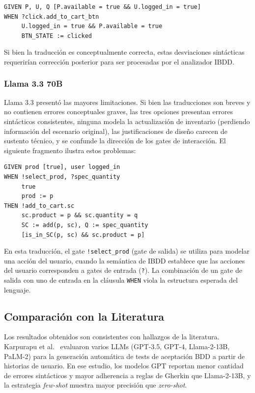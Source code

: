 \noindent\begin{minipage}{\linewidth}
\begin{lstlisting}
GIVEN P, U, Q [P.available = true && U.logged_in = true]
WHEN ?click.add_to_cart_btn
     U.logged_in = true && P.available = true
     BTN_STATE := clicked
\end{lstlisting}
\end{minipage}

Si bien la traducción es conceptualmente correcta, estas desviaciones sintácticas requerirían corrección posterior para ser procesadas por el analizador IBDD.

\subsubsection{Llama 3.3 70B}

Llama 3.3 presentó las mayores limitaciones. Si bien las traducciones son breves y no contienen errores conceptuales graves, las tres opciones presentan errores sintácticos consistentes, ninguna modela la actualización de inventario (perdiendo información del escenario original), las justificaciones de diseño carecen de sustento técnico, y se confunde la dirección de los gates de interacción. El siguiente fragmento ilustra estos problemas:

\vspace{0.25cm}
\noindent\begin{minipage}{\linewidth}
\begin{lstlisting}
GIVEN prod [true], user logged_in
WHEN !select_prod, ?spec_quantity
     true
     prod := p
THEN !add_to_cart.sc
     sc.product = p && sc.quantity = q
     SC := add(p, sc), Q := spec_quantity
     [is_in_SC(p, sc) && sc.product = p]
\end{lstlisting}
\end{minipage}

En esta traducción, el gate \texttt{!select\_prod} (gate de salida) se utiliza para modelar una acción del usuario, cuando la semántica de IBDD establece que las acciones del usuario corresponden a gates de entrada (\texttt{?}). La combinación de un gate de salida con uno de entrada en la cláusula \texttt{WHEN} viola la estructura esperada del lenguaje.

\subsection{Comparación con la Literatura}

Los resultados obtenidos son consistentes con hallazgos de la literatura. Karpurapu et al.~\cite{karpurapu2024llm} evaluaron varios LLMs (GPT-3.5, GPT-4, Llama-2-13B, PaLM-2) para la generación automática de tests de aceptación BDD a partir de historias de usuario. En ese estudio, los modelos GPT reportan menor cantidad de errores sintácticos y mayor adherencia a reglas de Gherkin que Llama-2-13B, y la estrategia \textit{few-shot} muestra mayor precisión que \textit{zero-shot}.

